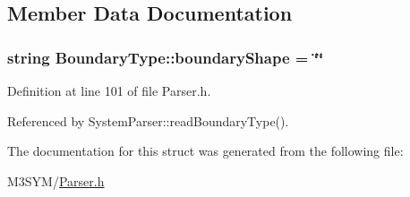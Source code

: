 \subsection{Member Data Documentation}
\hypertarget{structBoundaryType_a1c437edf87bf307f6f7023ef8fe75f1f}{
\subsubsection[{boundary\+Shape}]{\setlength{\rightskip}{0pt plus 5cm}string Boundary\+Type\+::boundary\+Shape = \char`\"{}\char`\"{}}}\label{structBoundaryType_a1c437edf87bf307f6f7023ef8fe75f1f}


Definition at line 101 of file Parser.\+h.



Referenced by System\+Parser\+::read\+Boundary\+Type().



The documentation for this struct was generated from the following file\+:\begin{DoxyCompactItemize}
\item 
M3\+S\+Y\+M/\hyperlink{Parser_8h}{Parser.\+h}\end{DoxyCompactItemize}
